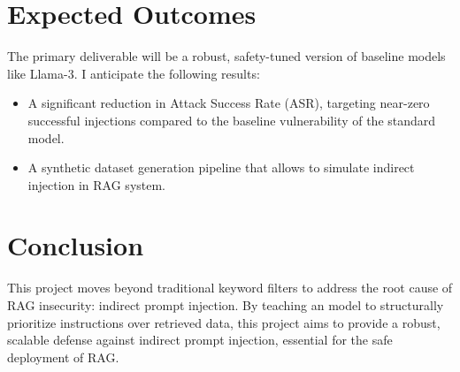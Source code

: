 \documentclass[sigconf]{acmart}
\begin{document}
\section{Expected Outcomes}

The primary deliverable will be a robust, safety-tuned version of baseline models like Llama-3. I anticipate the following results:
\begin{itemize}
    \item A significant reduction in Attack Success Rate (ASR), targeting near-zero successful injections compared to the baseline vulnerability of the standard model.
    \item A synthetic dataset generation pipeline that allows to simulate indirect injection in RAG system.
\end{itemize}

\section{Conclusion}
This project moves beyond traditional keyword filters to address the root cause of RAG insecurity: indirect prompt injection. By teaching an model to structurally prioritize instructions over retrieved data, this project aims to provide a robust, scalable defense against indirect prompt injection, essential for the safe deployment of RAG.




\end{document}
